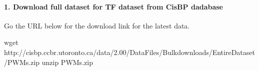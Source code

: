 \documentclass[letterpaper,10pt,english]{sphinxmanual}
\begin{document}
{
\begin{sphinxVerbatim}[commandchars=\\\{\}]
\llap{\color{nbsphinxin}[ ]:\,\hspace{\fboxrule}\hspace{\fboxsep}}
\end{sphinxVerbatim}
}


\paragraph{1. Download full dataset for TF dataset from CisBP dadabase}
\label{\detokenize{notebooks/02_motif_scan/motif_data_preparation/02_How_to_prepare_custom_motif_data:1.-Download-full-dataset-for-TF-dataset-from-CisBP-dadabase}}
Go the URL below for the download link for the latest data. 

{
\begin{sphinxVerbatim}[commandchars=\\\{\}]
\llap{\color{nbsphinxin}[2]:\,\hspace{\fboxrule}\hspace{\fboxsep}} wget http://cisbp.ccbr.utoronto.ca/data/2.00/DataFiles/Bulk\PYGZus{}downloads/EntireDataset/PWMs.zip
 unzip PWMs.zip
\end{sphinxVerbatim}
}
\end{document}
